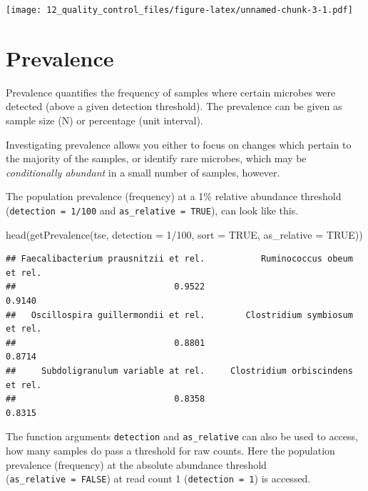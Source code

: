\documentclass[
]{book}
\newenvironment{Shaded}{\begin{snugshade}}{\end{snugshade}}
\newcommand{\AttributeTok}[1]{\textcolor[rgb]{0.77,0.63,0.00}{#1}}
\newcommand{\ConstantTok}[1]{\textcolor[rgb]{0.00,0.00,0.00}{#1}}
\newcommand{\DecValTok}[1]{\textcolor[rgb]{0.00,0.00,0.81}{#1}}
\newcommand{\FunctionTok}[1]{\textcolor[rgb]{0.00,0.00,0.00}{#1}}
\newcommand{\NormalTok}[1]{#1}
\newcommand{\SpecialCharTok}[1]{\textcolor[rgb]{0.00,0.00,0.00}{#1}}
\begin{document}
\texttt{[image: 12\_quality\_control\_files/figure-latex/unnamed-chunk-3-1.pdf]}

\hypertarget{prevalence}{%
\section{Prevalence}\label{prevalence}}

Prevalence quantifies the frequency of samples where certain microbes
were detected (above a given detection threshold). The prevalence can
be given as sample size (N) or percentage (unit interval).

Investigating prevalence allows you either to focus on changes which
pertain to the majority of the samples, or identify rare microbes,
which may be \emph{conditionally abundant} in a small number of samples,
however.

The population prevalence (frequency) at a 1\% relative abundance
threshold (\texttt{detection\ =\ 1/100} and \texttt{as\_relative\ =\ TRUE}), can look
like this.

\begin{Shaded}
\begin{Highlighting}[]
\FunctionTok{head}\NormalTok{(}\FunctionTok{getPrevalence}\NormalTok{(tse, }\AttributeTok{detection =} \DecValTok{1}\SpecialCharTok{/}\DecValTok{100}\NormalTok{, }\AttributeTok{sort =} \ConstantTok{TRUE}\NormalTok{, }\AttributeTok{as\_relative =} \ConstantTok{TRUE}\NormalTok{))}
\end{Highlighting}
\end{Shaded}

\begin{verbatim}
## Faecalibacterium prausnitzii et rel.           Ruminococcus obeum et rel. 
##                               0.9522                               0.9140 
##   Oscillospira guillermondii et rel.        Clostridium symbiosum et rel. 
##                               0.8801                               0.8714 
##     Subdoligranulum variable at rel.     Clostridium orbiscindens et rel. 
##                               0.8358                               0.8315
\end{verbatim}

The function arguments \texttt{detection} and \texttt{as\_relative} can also be used
to access, how many samples do pass a threshold for raw counts. Here
the population prevalence (frequency) at the absolute abundance
threshold (\texttt{as\_relative\ =\ FALSE}) at read count 1 (\texttt{detection\ =\ 1}) is
accessed.
\end{document}
